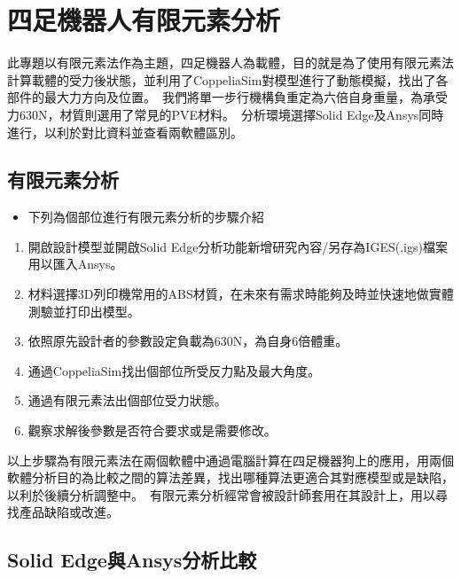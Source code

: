 \chapter{四足機器人有限元素分析}

此專題以有限元素法作為主題，四足機器人為載體，目的就是為了使用有限元素法計算載體的受力後狀態，並利用了CoppeliaSim對模型進行了動態模擬，找出了各部件的最大力方向及位置。\
我們將單一步行機構負重定為六倍自身重量，為承受力630N，材質則選用了常見的PVE材料。\
分析環境選擇Solid Edge及Ansys同時進行，以利於對比資料並查看兩軟體區別。\\

\section{有限元素分析}
\begin{itemize}
\item 下列為個部位進行有限元素分析的步驟介紹
\end{itemize}
\begin{enumerate}
\item 開啟設計模型並開啟Solid Edge分析功能新增研究內容/另存為IGES(.igs)檔案用以匯入Ansys。
\item 材料選擇3D列印機常用的ABS材質，在未來有需求時能夠及時並快速地做實體測驗並打印出模型。
\item 依照原先設計者的參數設定負載為630N，為自身6倍體重。
\item 通過CoppeliaSim找出個部位所受反力點及最大角度。
\item 通過有限元素法出個部位受力狀態。
\item 觀察求解後參數是否符合要求或是需要修改。
\end{enumerate}
以上步驟為有限元素法在兩個軟體中通過電腦計算在四足機器狗上的應用，用兩個軟體分析目的為比較之間的算法差異，找出哪種算法更適合其對應模型或是缺陷，以利於後續分析調整中。\
有限元素分析經常會被設計師套用在其設計上，用以尋找產品缺陷或改進。\
\newpage
\section{Solid Edge與Ansys分析比較}

\newpage
